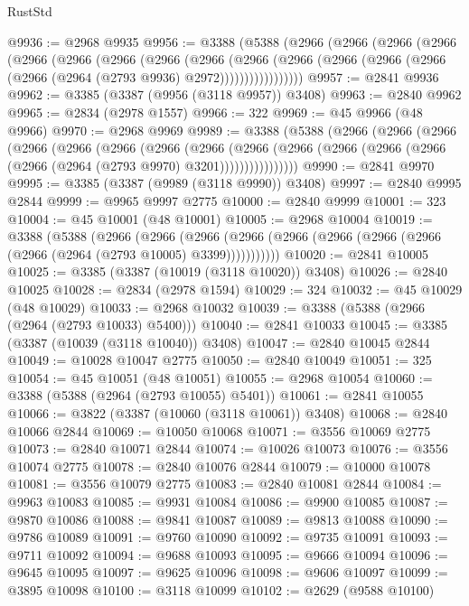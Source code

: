 \begin{lexlean}{RustStd}
\begin{coremodule}
{\begin{coremodule}
{{{{{{{{{{{{{{{{{{{{{{{{{{{{{{{{{@9936 := @2968 @9935
@9956 := @3388
    (@5388
      (@2966
        (@2966
          (@2966
            (@2966
              (@2966
                (@2966
                  (@2966
                    (@2966
                      (@2966
                        (@2966
                          (@2966
                            (@2966 (@2966 (@2966 (@2966 (@2964 (@2793 @9936) @2972)))))))))))))))))
@9957 := @2841 @9936
@9962 := @3385 (@3387 (@9956 (@3118 @9957)) @3408)
@9963 := @2840 @9962
@9965 := @2834 (@2978 @1557)
@9966 := 322
@9969 := @45 @9966 (@48 @9966)
@9970 := @2968 @9969
@9989 := @3388
    (@5388
      (@2966
        (@2966
          (@2966
            (@2966
              (@2966
                (@2966
                  (@2966
                    (@2966
                      (@2966
                        (@2966
                          (@2966 (@2966 (@2966 (@2966 (@2964 (@2793 @9970) @3201))))))))))))))))
@9990 := @2841 @9970
@9995 := @3385 (@3387 (@9989 (@3118 @9990)) @3408)
@9997 := @2840 @9995 @2844
@9999 := @9965 @9997 @2775
@10000 := @2840 @9999
@10001 := 323
@10004 := @45 @10001 (@48 @10001)
@10005 := @2968 @10004
@10019 := @3388
    (@5388
      (@2966
        (@2966
          (@2966 (@2966 (@2966 (@2966 (@2966 (@2966 (@2966 (@2964 (@2793 @10005) @3399)))))))))))
@10020 := @2841 @10005
@10025 := @3385 (@3387 (@10019 (@3118 @10020)) @3408)
@10026 := @2840 @10025
@10028 := @2834 (@2978 @1594)
@10029 := 324
@10032 := @45 @10029 (@48 @10029)
@10033 := @2968 @10032
@10039 := @3388 (@5388 (@2966 (@2964 (@2793 @10033) @5400)))
@10040 := @2841 @10033
@10045 := @3385 (@3387 (@10039 (@3118 @10040)) @3408)
@10047 := @2840 @10045 @2844
@10049 := @10028 @10047 @2775
@10050 := @2840 @10049
@10051 := 325
@10054 := @45 @10051 (@48 @10051)
@10055 := @2968 @10054
@10060 := @3388 (@5388 (@2964 (@2793 @10055) @5401))
@10061 := @2841 @10055
@10066 := @3822 (@3387 (@10060 (@3118 @10061)) @3408)
@10068 := @2840 @10066 @2844
@10069 := @10050 @10068
@10071 := @3556 @10069 @2775
@10073 := @2840 @10071 @2844
@10074 := @10026 @10073
@10076 := @3556 @10074 @2775
@10078 := @2840 @10076 @2844
@10079 := @10000 @10078
@10081 := @3556 @10079 @2775
@10083 := @2840 @10081 @2844
@10084 := @9963 @10083
@10085 := @9931 @10084
@10086 := @9900 @10085
@10087 := @9870 @10086
@10088 := @9841 @10087
@10089 := @9813 @10088
@10090 := @9786 @10089
@10091 := @9760 @10090
@10092 := @9735 @10091
@10093 := @9711 @10092
@10094 := @9688 @10093
@10095 := @9666 @10094
@10096 := @9645 @10095
@10097 := @9625 @10096
@10098 := @9606 @10097
@10099 := @3895 @10098
@10100 := @3118 @10099
@10102 := @2629 (@9588 @10100)
}}}}}}}}}}}}}}}}}}}}}}}}}}}}}}}}}
\end{coremodule}}
\end{coremodule}
\end{lexlean}

